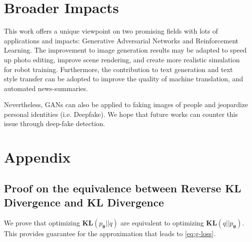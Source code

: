 \documentclass{article}
\newcommand{\kl}{\textbf{KL}}
\newcommand{\0}{\bm{0}}
\newcommand{\wm}{\bm{\theta}}
\begin{document}
\section*{Broader Impacts}
This work offers a unique viewpoint on two promising fields with lots of applications and impacts: Generative Adversarial Networks and Reinforcement Learning. The improvement to image generation results may be adapted to speed up photo editing, improve scene rendering, and create more realistic simulation for robot training. Furthermore, the contribution to text generation and text style transfer can be adopted to improve the quality of machine translation, and automated news-summaries.

Nevertheless, GANs can also be applied to faking images of people and jeopardize personal identities (i.e. Deepfake). We hope that future works can counter this issue through deep-fake detection.














\newpage



\section{Appendix}

\subsection{Proof on the equivalence between Reverse KL Divergence and KL Divergence} \label{pf_kl}
We prove that optimizing $\kl(p_{\wm} || q )$ are equivalent to optimizing $\kl(q || p_{\wm})$.
This provides guarantee for the approximation that leads to \eqref{eq:g-loss}. 
\end{document}
